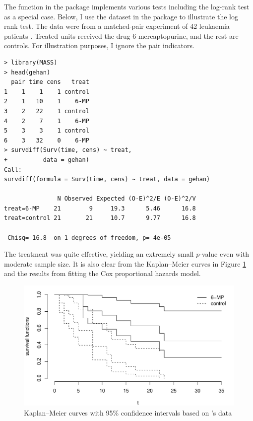 The  function in the  package implements various tests including the log-rank test as a special case. Below, I use the  dataset in the  package to illustrate the log rank test. The data were from a matched-pair experiment of 42 leukaemia patients \citep{gehan1965generalized}. Treated units received the drug 6-mercaptopurine, and the rest are controls. For illustration purposes, I ignore the pair indicators. 


 

\begin{lstlisting}
> library(MASS)
> head(gehan)
  pair time cens   treat
1    1    1    1 control
2    1   10    1    6-MP
3    2   22    1 control
4    2    7    1    6-MP
5    3    3    1 control
6    3   32    0    6-MP
> survdiff(Surv(time, cens) ~ treat,
+          data = gehan)
Call:
survdiff(formula = Surv(time, cens) ~ treat, data = gehan)

               N Observed Expected (O-E)^2/E (O-E)^2/V
treat=6-MP    21        9     19.3      5.46      16.8
treat=control 21       21     10.7      9.77      16.8

 Chisq= 16.8  on 1 degrees of freedom, p= 4e-05 
 \end{lstlisting}
 
 

The treatment was quite effective, yielding an extremely small $p$-value even with moderate sample size. It is also clear from the Kaplan--Meier curves in Figure \ref{fig:: gehan_kmcurve-data} and the results from fitting the Cox proportional hazards model. 

\begin{figure}[th]
\centering
\includegraphics[width = \textwidth]{figures/gehan_kmcurve}
\caption{Kaplan--Meier curves with 95\% confidence intervals based on \citet{gehan1965generalized}'s data}\label{fig:: gehan_kmcurve-data}
\end{figure}


